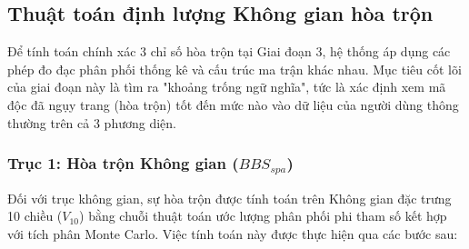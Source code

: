 \documentclass[../main.tex]{subfiles}
\begin{document}
\subsection{Thuật toán định lượng Không gian hòa trộn}
Để tính toán chính xác 3 chỉ số hòa trộn tại Giai đoạn 3, hệ thống áp dụng các phép đo đạc phân phối thống kê và cấu trúc ma trận khác nhau. Mục tiêu cốt lõi của giai đoạn này là tìm ra "khoảng trống ngữ nghĩa", tức là xác định xem mã độc đã ngụy trang (hòa trộn) tốt đến mức nào vào dữ liệu của người dùng thông thường trên cả 3 phương diện.

\subsubsection{Trục 1: Hòa trộn Không gian ($BBS_{spa}$)}
Đối với trục không gian, sự hòa trộn được tính toán trên Không gian đặc trưng 10 chiều ($V_{10}$) bằng chuỗi thuật toán ước lượng phân phối phi tham số kết hợp với tích phân Monte Carlo. Việc tính toán này được thực hiện qua các bước sau:
\end{document}
